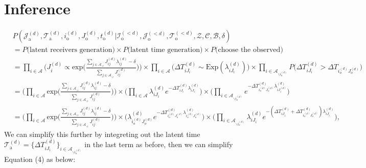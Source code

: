 \documentclass[a4paper]{article}
\begin{document}
\section{Inference}
\begin{equation}
\begin{aligned}
&P(\mathcal{J}^{(d)}_{\mbox{a}}, \mathcal{T}^{(d)}_{\mbox{a}}, i^{(d)}_{\mbox{o}}, J^{(d)}_{\mbox{o}}, t^{(d)}_{\mbox{o}} |\mathcal{I}^{(<d)}_{\mbox{o}}, \mathcal{J}^{(<d)}_{\mbox{o}}, \mathcal{T}^{(<d)}_{\mbox{o}}, \mathcal{Z}, \mathcal{C}, \mathcal{B}, \delta)\\&=P\Big(\mbox{latent receivers generation}\Big) \times P\Big(\mbox{latent time generation}\Big)\times P\Big(\mbox{choose the observed}\Big) \\&
=\prod_{i\in \mathcal{A}}\Big(J_{i}^{(d)}\propto \mbox{exp}\Big(\frac{\sum_{j \in \mathcal{A}_{\backslash i}}J^{(d)}_{ij}\lambda^{(d)}_{ij} - \delta}{\sum\limits_{j \in \mathcal{A}_{\backslash i}}J^{(d)}_{ij}}\Big)\Big) \times \prod_{i\in \mathcal{A}}\Big(\Delta T^{(d)}_{iJ_i}\sim\mbox{Exp}(\lambda^{(d)}_{iJ_i})\Big) \times \prod_{i\in \mathcal{A}_{\backslash i_o^{(d)}}} P\Big(\Delta T^{(d)}_{i{J_i}} > \Delta T_{i_{o}^{(d)}{J_{o}^{(d)}}}\Big)\\&
=\Big(\prod_{i\in \mathcal{A}}\mbox{exp}\Big(\frac{\sum_{j \in \mathcal{A}_{\backslash i}}J^{(d)}_{ij}\lambda^{(d)}_{ij} - \delta}{\sum\limits_{j \in \mathcal{A}_{\backslash i}}J^{(d)}_{ij}}\Big)\Big)\times \Big(\prod_{i \in\mathcal{A}}\lambda^{(d)}_{iJ_i}e^{-\Delta T^{(d)}_{iJ_i}\lambda^{(d)}_{iJ_i}}\Big)\times \Big( \prod_{i\in \mathcal{A}_{\backslash i_o^{(d)}}} e^{-\Delta T^{(d)}_{i_o^{(d)}J_o^{(d)}}\lambda^{(d)}_{iJ^{(d)}_{i}}}\Big)
\\&
=\Big(\prod_{i\in \mathcal{A}} \mbox{exp}\Big(\frac{\sum_{j \in \mathcal{A}_{\backslash i}}J^{(d)}_{ij}\lambda^{(d)}_{ij} - \delta}{\sum\limits_{j \in \mathcal{A}_{\backslash i}}J^{(d)}_{ij}}\Big)\Big)\times\Big(\lambda^{(d)}_{i_o^{(d)}J_o^{(d)}}e^{-\Delta T^{(d)}_{i_o^{(d)}J_o^{(d)}}\lambda^{(d)}_{i_o^{(d)}J_o^{(d)}}}\Big)\times \Big( \prod_{i\in \mathcal{A}_{\backslash i_o^{(d)}}} \lambda^{(d)}_{iJ_i}e^{-(\Delta T^{(d)}_{iJ_i} + \Delta T^{(d)}_{i_o^{(d)}J_o^{(d)}})\lambda^{(d)}_{iJ_i}}\Big),
\end{aligned}
\end{equation}
We can simplify this further by integreting out the latent time $\mathcal{T}^{(d)}_{\mbox{a}}=\{\Delta T^{(d)}_{iJ_i}\}_{i \in \mathcal{A}_{\backslash i_o^{(d)}}}$ in the last term as before, then we can simplify Equation (4) as below:
\end{document}
